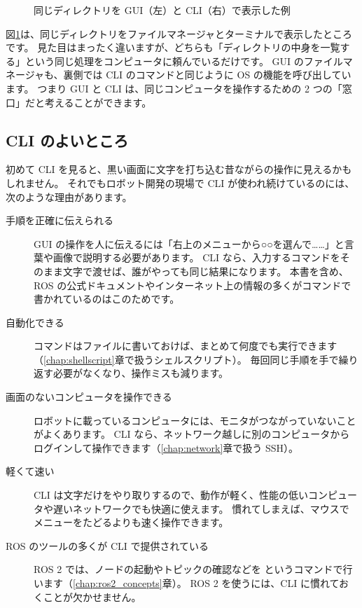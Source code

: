 \begin{figure}[tb]
  \centering
  \large
  \caption{同じディレクトリを GUI（左）と CLI（右）で表示した例}
  \label{fig:terminal-gui-cli}
\end{figure}

図\ref{fig:terminal-gui-cli}は、同じディレクトリをファイルマネージャとターミナルで表示したところです。
見た目はまったく違いますが、どちらも「ディレクトリの中身を一覧する」という同じ処理をコンピュータに頼んでいるだけです。
GUI のファイルマネージャも、裏側では CLI のコマンドと同じように OS の機能を呼び出しています。
つまり GUI と CLI は、同じコンピュータを操作するための 2 つの「窓口」だと考えることができます。

\subsection{CLI のよいところ}

初めて CLI を見ると、黒い画面に文字を打ち込む昔ながらの操作に見えるかもしれません。
それでもロボット開発の現場で CLI が使われ続けているのには、次のような理由があります。

\begin{description}
  \item[手順を正確に伝えられる]
    GUI の操作を人に伝えるには「右上のメニューから○○を選んで……」と言葉や画像で説明する必要があります。
    CLI なら、入力するコマンドをそのまま文字で渡せば、誰がやっても同じ結果になります。
    本書を含め、ROS の公式ドキュメントやインターネット上の情報の多くがコマンドで書かれているのはこのためです。
  \item[自動化できる]
    コマンドはファイルに書いておけば、まとめて何度でも実行できます（\ref{chap:shellscript}章で扱うシェルスクリプト）。
    毎回同じ手順を手で繰り返す必要がなくなり、操作ミスも減ります。
  \item[画面のないコンピュータを操作できる]
    ロボットに載っているコンピュータには、モニタがつながっていないことがよくあります。
    CLI なら、ネットワーク越しに別のコンピュータからログインして操作できます（\ref{chap:network}章で扱う SSH）。
  \item[軽くて速い]
    CLI は文字だけをやり取りするので、動作が軽く、性能の低いコンピュータや遅いネットワークでも快適に使えます。
    慣れてしまえば、マウスでメニューをたどるよりも速く操作できます。
  \item[ROS のツールの多くが CLI で提供されている]
    ROS 2 では、ノードの起動やトピックの確認などを  というコマンドで行います（\ref{chap:ros2_concepts}章）。
    ROS 2 を使うには、CLI に慣れておくことが欠かせません。
\end{description}

